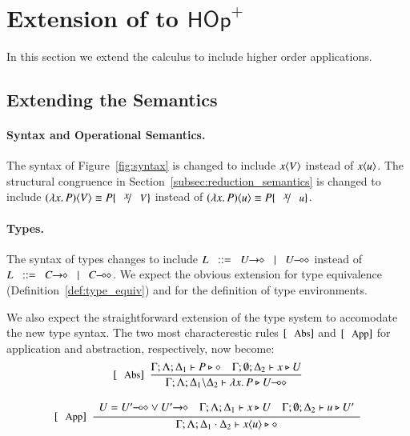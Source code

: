 \newcommand{\HOpp}{\ensuremath{\mathsf{HOp}^{+}}\xspace}
\section{Extension of \HOp to \HOpp}

In this section we extend the \HOp calculus to include higher order applications.

\subsection{Extending the Semantics}

\paragraph{Syntax and Operational Semantics.}

The syntax of Figure~\ref{fig:syntax} is changed to include $x\langle V \rangle$
instead of $x\langle u \rangle$.
The structural congruence in Section~\ref{subsec:reduction_semantics}
is changed to include $\appl{(\abs{x} P)}{V} \scong P \subst{x}{V}$
instead of $\appl{(\abs{x} P)}{u} \scong P \subst{x}{u}$.

\paragraph{Types.}

The syntax of types changes to include $L \bnfis \shot{U} \bnfbar \lhot{U}$
instead of $L \bnfis \shot{C} \bnfbar \lhot{C}$. We expect the obvious
extension for type equivalence (Definition~\ref{def:type_equiv})
and for the definition of type environments.

We also expect the straightforward extension of the type 
system to accomodate the new type syntax. The two
most characterestic rules $\trule{Abs}$ and $\trule{App}$ 
for application and abstraction, respectively, now become:
\[
	\begin{array}{c}
		\trule{Abs}~~\tree{
			\Gamma; \Lambda; \Delta_1 \proves P \hastype \Proc
			\quad
			\Gamma; \es; \Delta_2 \proves x \hastype U
		}{
			\Gamma; \Lambda; \Delta_1 \backslash \Delta_2 \proves \abs{x}{P} \hastype \lhot{U}
		}
		\\[6mm]

		\trule{App}~~\tree{
			\begin{array}{c}
				U = \lhot{U'} \lor \shot{U'}
				\quad
				\Gamma; \Lambda; \Delta_1 \proves x \hastype U
				\quad
				\Gamma; \es; \Delta_2 \proves u \hastype U'
			\end{array}
		}{
			\Gamma; \Lambda; \Delta_1 \cat \Delta_2 \proves \appl{x}{u} \hastype \Proc
		} 
	\end{array}
\]

